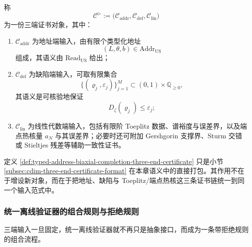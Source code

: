 \begin{definition}[三端证书对象]\label{def:typed-address-biaxial-completion-three-end-certificate}
称
\[
\mathcal C^{\triangleright}
:=
\bigl(
\mathcal C_{\mathrm{addr}},
\mathcal C_{\mathrm{def}},
\mathcal C_{\mathrm{lin}}
\bigr)
\]
为一份三端证书对象，其中：
\begin{enumerate}
  \item \(\mathcal C_{\mathrm{addr}}\) 为地址端输入，由有限个类型化地址
  \[
  (L,\theta,b)\in\mathrm{Addr}_{\mathrm{US}}
  \]
  组成，其语义由 \(\mathrm{Read}_{\mathrm{US}}\) 给出；
  \item \(\mathcal C_{\mathrm{def}}\) 为缺陷端输入，可取有限集合
  \[
  \{(\varrho_j,\varepsilon_j)\}_{j=1}^{M}\subset(0,1)\times\mathbb Q_{\ge 0},
  \]
  其语义是可核验地保证
  \[
  D_{\zeta}(\varrho_j)\le \varepsilon_j;
  \]
  \item \(\mathcal C_{\mathrm{lin}}\) 为线性代数端输入，包括有限阶 Toeplitz 数据、谱裕度与误差界，以及端点热核量 \(a_N\) 与其误差界；必要时还可附加 Gershgorin 支撑界、Sturm 交错或 Stieltjes 残差等辅助一致性证书。
\end{enumerate}
\end{definition}

\begin{remark}[三端输入的制度位置]\label{rem:typed-address-biaxial-completion-three-end-input}
定义 \ref{def:typed-address-biaxial-completion-three-end-certificate} 只是小节 \ref{subsec:cdim-three-end-certificate-format} 在本章语义中的直接打包。其作用不在于增设新对象，而在于把地址、缺陷与 Toeplitz/端点热核这三条证书链统一到同一个输入范式中。
\end{remark}

\subsubsection{统一离线验证器的组合规则与拒绝规则}\label{subsubsec:typed-address-biaxial-completion-unified-rejection-rule}
三端输入一旦固定，统一离线验证器就不再只是抽象接口，而成为一条带拒绝规则的组合流程。

